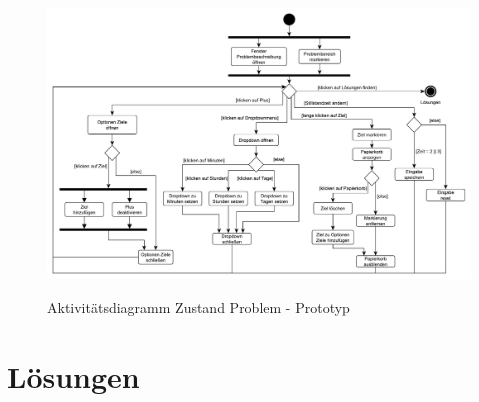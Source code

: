 \begin{figure}[htbp]
\centering
\includegraphics[angle=90,scale=0.5]{DA_files/Bilder/Prototyp/Aktivitaetsdiagramm-Problem.pdf}
\label{pic:Aktivitaetsdiagramm-Problem}
\caption{Aktivitätsdiagramm Zustand Problem - Prototyp}
\end{figure}

\section{Lösungen}
\label{5:Loesungen}
